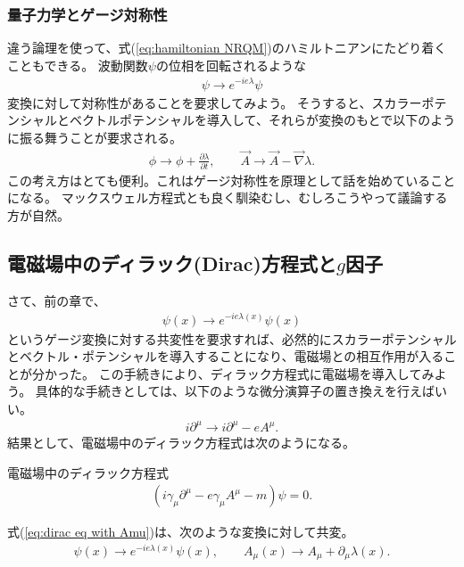 \documentclass[10pt,a4paper]{jarticle}
\begin{document}
\subsubsection{量子力学とゲージ対称性}
違う論理を使って、式(\ref{eq:hamiltonian NRQM})のハミルトニアンにたどり着くこともできる。
波動関数$\psi$の位相を回転されるような
\begin{align}
\psi \to e^{-ie\lambda} \psi
\end{align}
変換に対して対称性があることを要求してみよう。
そうすると、スカラーポテンシャルとベクトルポテンシャルを導入して、それらが変換のもとで以下のように振る舞うことが要求される。
\begin{align}
\phi \to \phi + \frac{\partial\lambda}{\partial t}, \qquad
\vec A \to \vec A - \vec\nabla \lambda.
\end{align}
この考え方はとても便利。これはゲージ対称性を原理として話を始めていることになる。
マックスウェル方程式とも良く馴染むし、むしろこうやって議論する方が自然。

\subsection{電磁場中のディラック(Dirac)方程式と$g$因子}
さて、前の章で、
\begin{align}
\psi(x) \to e^{-ie\lambda(x) }\psi(x)
\end{align}
というゲージ変換に対する共変性を要求すれば、必然的にスカラーポテンシャルとベクトル・ポテンシャルを導入することになり、電磁場との相互作用が入ることが分かった。
この手続きにより、ディラック方程式に電磁場を導入してみよう。
具体的な手続きとしては、以下のような微分演算子の置き換えを行えばいい。
\begin{align}
i\partial^\mu \to i\partial^\mu - eA^\mu.
\end{align}
結果として、電磁場中のディラック方程式は次のようになる。

\begin{itembox}[l]{電磁場中のディラック方程式}
\begin{align}
(i\gamma_\mu \partial^\mu - e \gamma_\mu A^\mu - m)\psi = 0. \label{eq:dirac eq with Amu}
\end{align}
\end{itembox}
式(\ref{eq:dirac eq with Amu})は、次のような変換に対して共変。
\begin{align}
\psi(x) \to e^{-ie\lambda(x)}\psi(x), \qquad
A_{\mu}(x) \to A_{\mu} + \partial_\mu \lambda(x).
\end{align}
\end{document}
